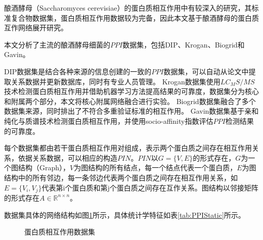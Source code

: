 酿酒酵母（Saccharomyces cerevisiae）的蛋白质相互作用中有较深入的研究，其标准复合物数据集，蛋白质相互作用数据较为完备，因此本文基于酿酒酵母的蛋白质互作网络展开研究。

本文分析了主流的酿酒酵母细菌的$PPI$数据集，包括DIP\cite{salwinski_database_2004}、Krogan\cite{krogan_global_2006}、Biogrid\cite{stark_biogrid_2006}和Gavin\cite{gavin_proteome_2006}。

DIP数据集是结合各种来源的信息创建的一致的$PPI$数据集，可以自动从论文中提取关系数据并更新数据库，同时有专业人员管理。
Krogan数据集使用$LC_MS/MS$技术检测蛋白质相互作用并借助机器学习方法提高结果的可靠度，数据集分为核心和附属两个部分，本文将核心附属网络融合进行实验。
Biogrid数据集融合了多个数据集来源，同时排出了不符合多重验证标准的相互作用。
Gavin数据集基于亲和纯化与质谱技术检测蛋白质相互作用，并使用socio-affinity指数评估$PPI$检测结果的可靠度。

每个数据集都由若干蛋白质相互作用对组成，表示两个蛋白质之间存在相互作用关系，依据关系数据，可以相应的构造$PIN$。$PIN$以$G=\{V,E\}$的形式存在，$G$为一个图结构（Graph），$V$为图结构的所有结点，每一个结点代表一个蛋白质，$E$为图结构中的所有邻边，每一条邻边代表两个蛋白质之间存在相互作用关系，如$E=\{V_i,V_j\}$代表第i个蛋白质和第j个蛋白质之间存在互作关系。图结构以邻接矩阵的形式存在$A\in \mathbb{R}^{n\times n}$。

数据集具体的网络结构如图\ref{fig:ppi-datasets}所示，具体统计学特征如表\ref{tab:PPIStatic}所示。

\begin{figure}[htbp]
    \centering
    \vskip0.5cm
    \caption{蛋白质相互作用数据集}
    \label{fig:ppi-datasets}
\end{figure}


